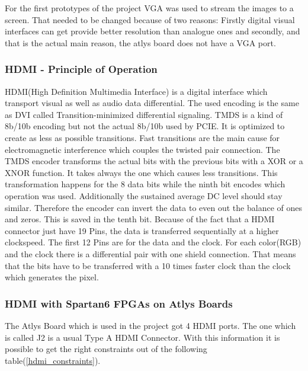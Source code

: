 For the first prototypes of the project VGA was used to stream the images to a screen. That needed to be changed because of two reasons: Firstly digital visual interfaces can get provide better resolution than analogue ones and secondly, and that is the actual main reason, the atlys board does not have a VGA port.

\subsubsection{HDMI - Principle of Operation}
HDMI(High Definition Multimedia Interface) is a digital interface which transport visual as well as audio data differential. The used encoding is the same as DVI called Transition-minimized differential signaling. TMDS is a kind of 8b/10b encoding but not the actual 8b/10b used by PCIE. It is optimized to create as less as possible transitions. Fast transitions are the main cause for electromagnetic interference which couples the twisted pair connection. \newline
The TMDS encoder transforms the actual bits with the previous bits with a XOR or a XNOR function. It takes always the one which causes less transitions. This transformation happens for the 8 data bits while the ninth bit encodes which operation was used. Additionally the sustained average DC level should stay similar. Therefore the encoder can invert the data to even out the balance of ones and zeros. This is saved in the tenth bit. \newline
Because of the fact that a HDMI connector just have 19 Pins, the data is transferred sequentially at a higher clockspeed. The first 12 Pins are for the data and the clock. For each color(RGB) and the clock there is a differential pair with one shield connection. That means that the bits have to be transferred with a 10 times faster clock than the clock which generates the pixel.



\subsubsection{HDMI with Spartan6 FPGAs on Atlys Boards}
The Atlys Board which is used in the project got 4 HDMI ports. The one which is called J2 is a usual Type A HDMI Connector. With this information it is possible to get the right constraints out of the following table(\ref{hdmi_constraints}).

